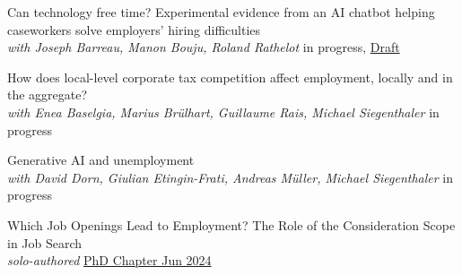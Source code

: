 \documentclass[letter, 11pt]{res}
\begin{document}
\begin{resume}


Can technology free time? Experimental evidence from an AI chatbot helping caseworkers solve employers' hiring difficulties  \\
{\sl with  Joseph Barreau, Manon Bouju, Roland Rathelot} \hfill in progress, \href{https://jklaeui.github.io/download/MatchFT.pdf}{Draft}

How does local-level corporate tax competition affect employment, locally and in the aggregate?  \\
{\sl with Enea Baselgia, Marius Brülhart, Guillaume Rais, Michael Siegenthaler} \hfill in progress

Generative AI and unemployment  \\
{\sl with David Dorn, Giulian Etingin-Frati, Andreas Müller, Michael Siegenthaler} \hfill in progress

Which Job Openings Lead to Employment? The Role
of the Consideration Scope in Job Search \\
{\sl solo-authored} \hfill \href{https://api.unil.ch/iris/server/api/core/bitstreams/031700df-f881-4e74-bfe3-51930f2ca265/content#page=28}{PhD Chapter Jun 2024}



\end{resume}
\end{document}
